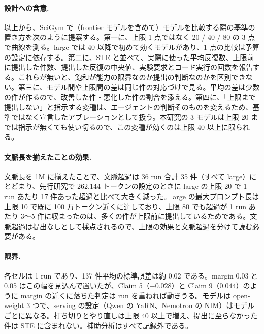 \documentclass{article}
\providecommand{\unverified}[1]{#1}
\begin{document}
\paragraph{設計への含意.}
以上から、SciGym で（frontier モデルを含めて）モデルを比較する際の基準の置き方を次のように提案する。第一に、上限 1 点ではなく 20 / 40 / 80 の 3 点で曲線を測る。large では 40 以降で初めて効くモデルがあり、1 点の比較は予算の設定に依存する。第二に、STE と並べて、実際に使った平均反復数、上限前に提出した件数、提出した反復の中央値、実験要求とコード実行の回数を報告する。これらが無いと、飽和が能力の限界なのか提出の判断なのかを区別できない。第三に、モデル間や上限間の差は同じ件の対応づけで見る。平均の差は少数の件が作るので、改善した件・悪化した件の割合を添える。第四に、「上限まで提出しない」と指示する変種は、エージェントの判断そのものを変えるため、基準ではなく宣言したアブレーションとして扱う。本研究の 3 モデルは上限 20 までは指示が無くても使い切るので、この変種が効くのは上限 40 以上に限られる。

\paragraph{文脈長を揃えたことの効果.}
文脈長を 1M に揃えたことで、文脈超過は 36 run 合計 \unverified{35} 件（すべて large）にとどまり、先行研究で 262,144 トークンの設定のときに large の上限 20 で 1 run あたり 17 件あった超過と比べて大きく減った。large の最大プロンプト長は上限 10 で既に 100 万トークン近くに達しており、上限 80 でも超過が 1 run あたり 3〜5 件に収まったのは、多くの件が上限前に提出しているためである。文脈超過は提出なしとして採点されるので、上限の効果と文脈超過を分けて読む必要がある。

\paragraph{限界.}
各セルは 1 run であり、137 件平均の標準誤差は約 0.02 である。margin 0.03 と 0.05 はこの幅を見込んで置いたが、Claim 5（$-0.028$）と Claim 9（$0.044$）のように margin の近くに落ちた判定は run を重ねれば動きうる。モデルは open-weight 3 つで、serving の設定（Qwen の YaRN、Nemotron の NIM）はモデルごとに異なる。打ち切りとやり直しは上限 40 以上で増え、提出に至らなかった件は STE に含まれない。補助分析はすべて記録外である。
\end{document}
